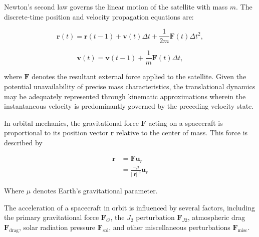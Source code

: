 
Newton's second law governs the linear motion of the satellite with mass $m$. The discrete-time position and 
velocity propagation equations are:

\begin{equation}
    \mathbf{r}(t) = \mathbf{r}(t-1) + \mathbf{v}(t)\Delta t + \frac{1}{2m}\mathbf{F}(t)\Delta t^2,
\end{equation}

\begin{equation}
    \mathbf{v}(t) = \mathbf{v}(t-1) + \frac{1}{m}\mathbf{F}(t)\Delta t,  
\end{equation}

\noindent where $\mathbf{F}$ denotes the resultant external force applied to the satellite. 
Given the potential unavailability of precise mass characteristics, the translational dynamics 
may be adequately represented through kinematic approximations wherein the instantaneous velocity is predominantly governed by the preceding velocity state.
\vspace{0.5cm}

\noindent In orbital mechanics, the gravitational force $\mathbf{F}$ acting on a spacecraft is 
proportional to its position vector $\mathbf{r}$ relative to the center of mass. This force is described by

\begin{equation}
\begin{split}
    \ddot{\mathbf{r}} &= \mathbf{F}\mathbf{u}_r \\
    &= \frac{-\mu}{||\mathbf{r}||^3}\mathbf{u}_r
\end{split}
\end{equation}

\noindent
Where $\mu$ denotes Earth's gravitational parameter.
\vspace{0.5cm} 

\noindent
The acceleration of a spacecraft in orbit is influenced by several factors, including the primary gravitational 
force $\mathbf{F}_G$, the $J_2$ perturbation $\mathbf{F}_{J2}$, atmospheric drag $\mathbf{F}_{\text{drag}}$, solar radiation 
pressure $\mathbf{F}_{\text{sol}}$, and other miscellaneous perturbations $\mathbf{F}_{\text{misc}}$.
\vspace{0.5cm}

